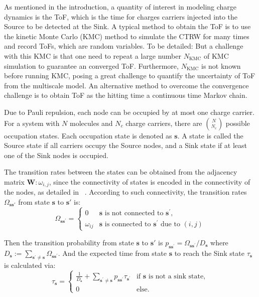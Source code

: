 \documentclass[letterpaper,12pt]{article}
\begin{document}
As mentioned in the introduction, a quantity of interest in modeling charge dynamics is the ToF, which is the time for charges carriers injected into the Source to be detected at the Sink.
A typical method to obtain the ToF is to use the kinetic Monte Carlo (KMC) method to simulate the CTRW for many times and record ToFs, which are random variables. 
To be detailed: 
But a challenge with this KMC is that one need to repeat a large number $N_\text{KMC}$ of KMC simulation to guarantee an converged ToF. Furthermore, $N_\text{KMC}$ is not known before running KMC, posing a great challenge to quantify the uncertainty of ToF from the multiscale model. 
An alternative method to overcome the convergence challenge is to obtain ToF as the hitting time a continuous time Markov chain.

Due to Pauli repulsion, each node can be occupied by at most one charge carrier. For a system with $N$ molecules and $N_c$ charge carriers, there are ${N \choose N_c}$ possible occupation states. Each occupation state is denoted as $\mathbf{s}$. A state is called the Source state if all carriers occupy the Source nodes, and a Sink state if at least one of the Sink nodes is occupied.

The transition rates between the states can be obtained from the adjacency matrix $\mathbf{W}:\omega_{i,j}$, since the connectivity of states is encoded in the connectivity of the nodes, as detailed in ~\cite{chen_graph_2024}. 
According to such connectivity, 
the transition rates $\Omega_{\mathbf{s} \mathbf{s}' }$ from state $\mathbf{s}$ to $\mathbf{s}'$ is:
\begin{equation}\label{eq:transition_rates}
	\Omega_{\mathbf{s} \mathbf{s}^\prime} =
	\begin{cases}
	     0			&  \mathbf{s} \text{ is not connected to } \mathbf{s}^\prime,\\
	    \omega_{ij}	&  \mathbf{s} \text{ is connected to } \mathbf{s}^\prime \text{ due to } (i,j)
	\end{cases}
\end{equation}

Then the transition probability from state $\mathbf{s}$ to $\mathbf{s}'$ is $p_{\mathbf{s} \mathbf{s}^\prime} = \Omega_{\mathbf{s} \mathbf{s}^\prime}/D_\mathbf{s}$ where $D_\mathbf{s} := \sum_{\mathbf{s}^\prime \ne \mathbf{s}} \Omega_{\mathbf{s} \mathbf{s}^\prime}$.
And the expected time from state $\mathbf{s}$ to reach the Sink state $\tau_\mathbf{s}$ is calculated via: 
\begin{equation}\label{eq:hitting_time}
	\tau_\mathbf{s} = \begin{cases}
		\frac{1}{D_\mathbf{s}} + \sum_{\mathbf{s}^\prime \ne \mathbf{s}} p_{\mathbf{s} \mathbf{s}^\prime} \tau_{\mathbf{s}^\prime} &\text{if $\mathbf{s}$ is not a sink state},\\
		0 &\text{else.} 
	\end{cases}
\end{equation} 
\end{document}
